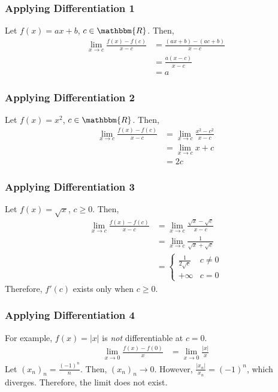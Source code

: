 \documentclass[10pt]{extarticle}
\newcommand{\R}{\mathbbm{R}}
\begin{document}
  \subsubsection{Applying Differentiation 1}%
    Let $f(x) = ax+b$, $c\in\R$. Then,
    \begin{align*}
      \lim_{x\rightarrow c} \frac{f(x) - f(c)}{x-c} &= \frac{(ax+b) - (ac+b)}{x-c}\\
                              &= \frac{a(x-c)}{x-c}\\
                              &= a
    \end{align*}
  \subsubsection{Applying Differentiation 2}%
    Let $f(x) = x^2$, $c\in\R$. Then,
    \begin{align*}
      \lim_{x\rightarrow c}\frac{f(x) - f(c)}{x-c} &= \lim_{x\rightarrow c}\frac{x^2 - c^2}{x-c}\\
                                                   &= \lim_{x\rightarrow c} x+c\\
                                                   &= 2c
    \end{align*}
  \subsubsection{Applying Differentiation 3}%
    Let $f(x) = \sqrt{x}$, $c \geq 0$. Then,
    \begin{align*}
      \lim_{x\rightarrow c} \frac{f(x) - f(c)}{x-c} &= \lim_{x\rightarrow c}\frac{\sqrt{x} - \sqrt{c}}{x-c}\\
                                                    &= \lim_{x\rightarrow c}\frac{1}{\sqrt{x} + \sqrt{c}}\\
                                                    &= \begin{cases}
                                                      \frac{1}{2\sqrt{c}} & c \neq 0\\
                                                      +\infty & c = 0
                                                    \end{cases}
    \end{align*}
    Therefore, $f'(c)$ exists only when $c\geq 0$.
  \subsubsection{Applying Differentiation 4}%
    For example, $f(x) = |x|$ is \textit{not} differentiable at $c=0$.
    \begin{align*}
      \lim_{x\rightarrow 0}\frac{f(x) - f(0)}{x} &= \lim_{x\rightarrow 0}\frac{|x|}{x}
    \end{align*}
    Let $(x_n)_n = \frac{(-1)^n}{n}$. Then, $(x_n)_n \rightarrow 0$. However, $\frac{|x_n|}{x_n} = (-1)^{n}$, which diverges. Therefore, the limit does not exist.
\end{document}
